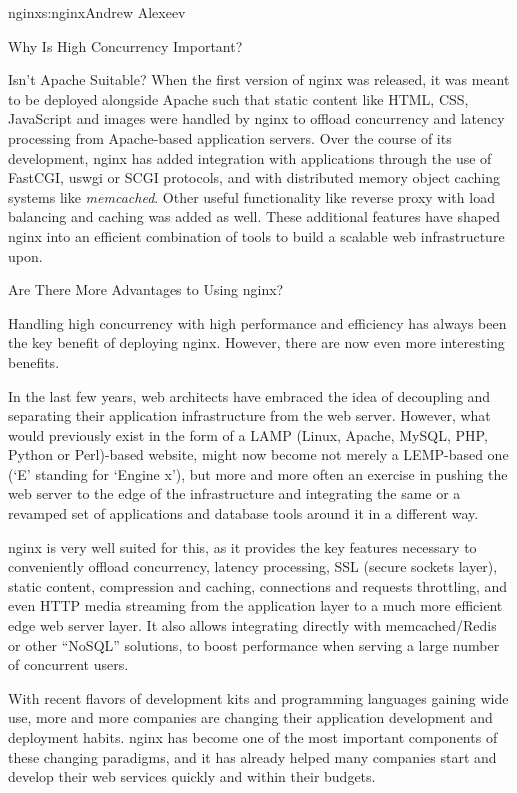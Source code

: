 \begin{aosachapter}{nginx}{s:nginx}{Andrew Alexeev}
\begin{aosasect1}{Why Is High Concurrency Important?}
\begin{aosasect2}{Isn't Apache Suitable?}
When the first version of nginx was released, it was meant to be
deployed alongside Apache such that static content like HTML, CSS,
JavaScript and images were handled by nginx to offload concurrency and
latency processing from Apache-based application servers. Over the
course of its development, nginx has added integration with
applications through the use of FastCGI, uswgi or SCGI protocols, and
with distributed memory object caching systems like
\emph{memcached}. Other useful functionality like reverse proxy with
load balancing and caching was added as well. These additional
features have shaped nginx into an efficient combination of tools
to build a scalable web infrastructure upon.

\end{aosasect2}

\begin{aosasect2}{Are There More Advantages to Using nginx?}

Handling high concurrency with high performance and efficiency has
always been the key benefit of deploying nginx. However, there
are now even more interesting benefits.

In the last few years, web architects have embraced the idea of
decoupling and separating their application infrastructure from the
web server. However, what would previously exist in the form of a LAMP
(Linux, Apache, MySQL, PHP, Python or Perl)-based website, might now
become not merely a LEMP-based one (`E' standing for `Engine
x'), but more and more often an exercise in pushing the web server to
the edge of the infrastructure and integrating the same or a revamped
set of applications and database tools around it in a different way.

nginx is very well suited for this, as it provides the key features
necessary to conveniently offload concurrency, latency processing, SSL
(secure sockets layer), static content, compression and caching,
connections and requests throttling, and even HTTP media streaming
from the application layer to a much more efficient edge web server
layer. It also allows integrating directly with memcached/Redis or
other ``NoSQL'' solutions, to boost performance when serving a large
number of concurrent users.

With recent flavors of development kits and programming languages
gaining wide use, more and more companies are changing their
application development and deployment habits. nginx has become one of
the most important components of these changing paradigms, and it
has already helped many companies start and develop their web services
quickly and within their budgets.


\end{aosasect2}
\end{aosasect1}
\end{aosachapter}
